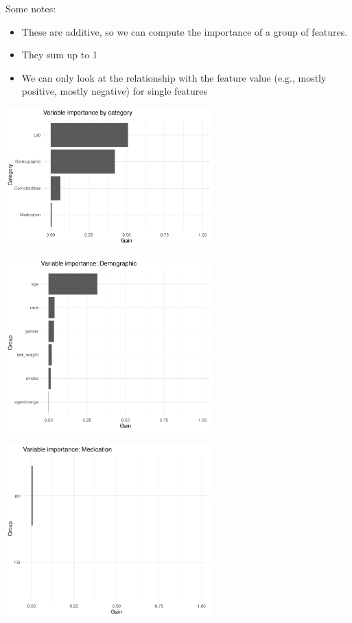 \documentclass[12pt]{article}
\begin{document}
Some notes:
\begin{itemize}
\item These are additive, so we can compute the importance of a group of features.
\item They sum up to 1
\item We can only look at the relationship with the feature value (e.g., mostly positive, mostly negative) for single features
\end{itemize}

\begin{center}
\includegraphics[width=0.6\textwidth]{figures/pdp_new/vi_cat.pdf}
\end{center}
\begin{center}
\includegraphics[width=0.6\textwidth]{figures/pdp_new/vi_group_Demographic.pdf}
\end{center}
\begin{center}
\includegraphics[width=0.6\textwidth]{figures/pdp_new/vi_group_Medication.pdf}
\end{center}
\end{document}
